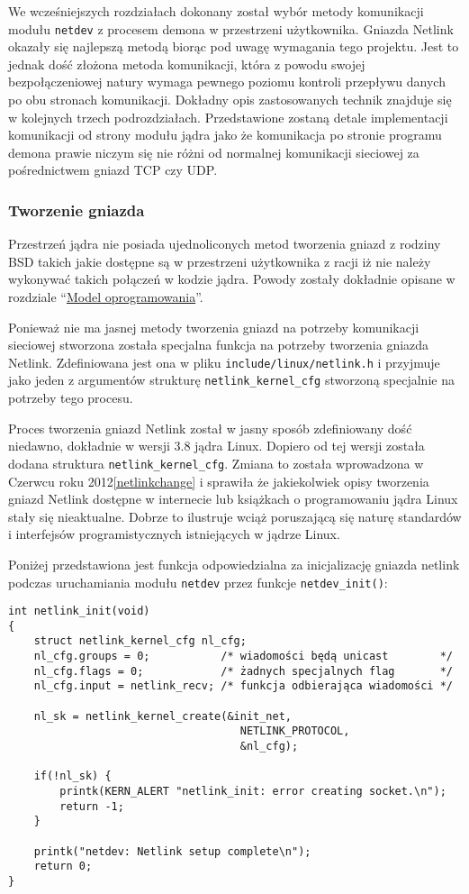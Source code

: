 \documentclass[10pt]{article}
\begin{document}
We wcześniejszych rozdziałach dokonany został wybór metody komunikacji modułu \texttt{netdev} z procesem demona w przestrzeni użytkownika.  Gniazda Netlink okazały się najlepszą metodą biorąc pod uwagę wymagania tego projektu. Jest to jednak dość złożona metoda komunikacji, która z powodu swojej bezpołączeniowej natury wymaga pewnego poziomu kontroli przepływu danych po obu stronach komunikacji. Dokładny opis zastosowanych technik znajduje się w kolejnych trzech podrozdziałach.  Przedstawione zostaną detale implementacji komunikacji od strony modułu jądra jako że komunikacja po stronie programu demona prawie niczym się nie różni od normalnej komunikacji sieciowej za pośrednictwem gniazd TCP czy UDP.

\subsubsection{Tworzenie gniazda}

Przestrzeń jądra nie posiada ujednoliconych metod tworzenia gniazd z rodziny BSD takich jakie dostępne są w przestrzeni użytkownika z racji iż nie należy wykonywać takich połączeń w kodzie jądra. Powody zostały dokładnie opisane w rozdziale ``\hyperref[model-oprogramowania]{Model oprogramowania}''.

Ponieważ nie ma jasnej metody tworzenia gniazd na potrzeby komunikacji sieciowej stworzona została specjalna funkcja na potrzeby tworzenia gniazda Netlink. Zdefiniowana jest ona w pliku \texttt{include/linux/netlink.h} i przyjmuje jako jeden z argumentów strukturę \texttt{netlink\_kernel\_cfg} stworzoną specjalnie na potrzeby tego procesu.

Proces tworzenia gniazd Netlink został w jasny sposób zdefiniowany dość niedawno, dokładnie w wersji 3.8 jądra Linux. Dopiero od tej wersji została dodana struktura \texttt{netlink\_kernel\_cfg}. Zmiana to została wprowadzona w Czerwcu roku 2012\ref{netlinkchange} i sprawiła że jakiekolwiek opisy tworzenia gniazd Netlink dostępne w internecie lub książkach o programowaniu jądra Linux stały się nieaktualne. Dobrze to ilustruje wciąż poruszającą się naturę standardów i interfejsów programistycznych istniejących w jądrze Linux.

Poniżej przedstawiona jest funkcja odpowiedzialna za inicjalizację gniazda netlink podczas uruchamiania modułu \texttt{netdev} przez funkcje \texttt{netdev\_init()}:

\begin{verbatim}
int netlink_init(void)
{
    struct netlink_kernel_cfg nl_cfg;
    nl_cfg.groups = 0;           /* wiadomości będą unicast        */
    nl_cfg.flags = 0;            /* żadnych specjalnych flag       */
    nl_cfg.input = netlink_recv; /* funkcja odbierająca wiadomości */

    nl_sk = netlink_kernel_create(&init_net,
                                    NETLINK_PROTOCOL,
                                    &nl_cfg);

    if(!nl_sk) {
        printk(KERN_ALERT "netlink_init: error creating socket.\n");
        return -1;
    }

    printk("netdev: Netlink setup complete\n");
    return 0;
}
\end{verbatim}
\end{document}
